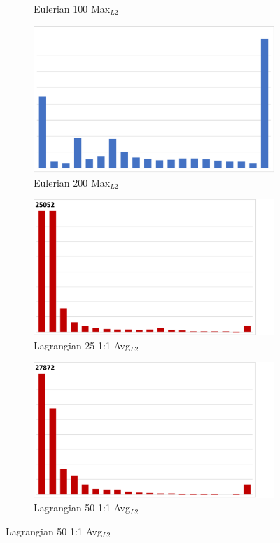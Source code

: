 \begin{figure}
\begin{subfigure}{0.24\textwidth}
\caption{Eulerian 100 Max$_{L2}$}
\end{subfigure}
\hspace{1mm}
\begin{subfigure}{0.24\textwidth}
\centering
\includegraphics[width=0.7\linewidth]{results/nyx/Eul200_Max.pdf}
\caption{Eulerian 200 Max$_{L2}$}
\end{subfigure}
\hspace{1mm}
\begin{subfigure}{0.24\textwidth}
\centering
\includegraphics[width=0.7\linewidth, trim={0cm 0cm 2.5cm 0cm}, clip]{results/nyx/Lag25_1_AvgL2.pdf}
\caption{Lagrangian 25 1:1 Avg$_{L2}$}
\end{subfigure}
\hspace{1mm}
\begin{subfigure}{0.24\textwidth}
\centering
\includegraphics[width=0.7\linewidth, trim={0cm 0cm 2.5cm 0cm}, clip]{results/nyx/Lag50_1_AvgL2.pdf}
\caption{Lagrangian 50 1:1 Avg$_{L2}$}

\end{subfigure}
\end{figure}
